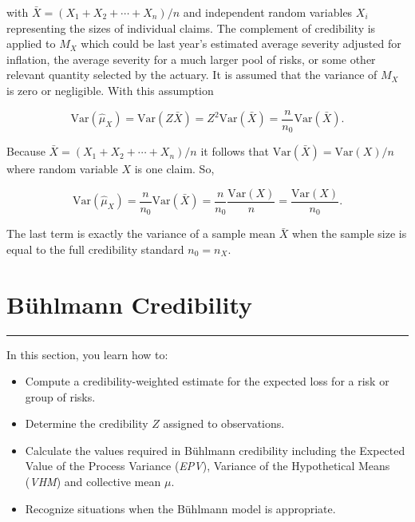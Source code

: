 \documentclass[]{book}
\providecommand{\tightlist}{%
  \setlength{\itemsep}{0pt}\setlength{\parskip}{0pt}}
\theoremstyle{definition}
\theoremstyle{definition}
\theoremstyle{definition}
\theoremstyle{remark}
\begin{document}
with \(\bar{X}=(X_1+X_2+\cdots+X_n)/n\) and independent random variables
\(X_i\) representing the sizes of individual claims. The complement of
credibility is applied to \(M_X\) which could be last year's estimated
average severity adjusted for inflation, the average severity for a much
larger pool of risks, or some other relevant quantity selected by the
actuary. It is assumed that the variance of \(M_X\) is zero or
negligible. With this assumption

\begin{equation*}
\mathrm{Var}(\hat{\mu}_X)=\mathrm{Var}(Z\bar{X})=Z^2\mathrm{Var}(\bar{X})=\frac{n}{n_0}\mathrm{Var}(\bar{X}).
\end{equation*}

Because \(\bar{X}=(X_1+X_2+\cdots+X_n)/n\) it follows that
\(\mathrm{Var}(\bar{X})=\mathrm{Var}(X)/n\) where random variable \(X\)
is one claim. So,

\begin{equation*}
\mathrm{Var}(\hat{\mu}_X)=\frac{n}{n_0}\mathrm{Var}(\bar{X})=\frac{n}{n_0}\frac{\mathrm{Var}(X)}{n}=\frac{\mathrm{Var}(X)}{n_0}.
\end{equation*}

The last term is exactly the variance of a sample mean \(\bar{X}\) when
the sample size is equal to the full credibility standard \(n_0=n_X\).

\section{Bühlmann Credibility}\label{buhlmann-credibility}

\begin{center}\rule{0.5\linewidth}{\linethickness}\end{center}

In this section, you learn how to:

\begin{itemize}
\tightlist
\item
  Compute a credibility-weighted estimate for the expected loss for a
  risk or group of risks.
\item
  Determine the credibility \(Z\) assigned to observations.
\item
  Calculate the values required in Bühlmann credibility including the
  Expected Value of the Process Variance (\emph{EPV}), Variance of the
  Hypothetical Means (\emph{VHM}) and collective mean \(\mu\).
\item
  Recognize situations when the Bühlmann model is appropriate.
\end{itemize}
\end{document}
